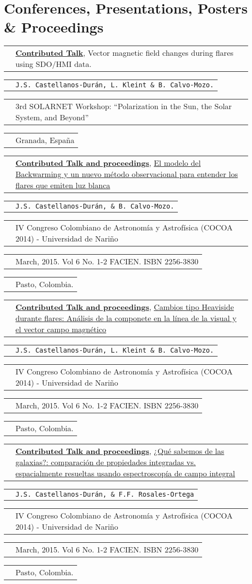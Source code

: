 \documentclass[11pt,letterpaper,sans]{moderncv}        %
\makeatletter
\renewcommand*{\cvitem}[3][.25em]{%
  \begin{tabular}{@{}p{\hintscolumnwidth}@{\hspace{\separatorcolumnwidth}}p{\maincolumnwidth}@{}}%
      \raggedleft\hintstyle{#2} &{#3}%
  \end{tabular}%
  \par\addvspace{#1}}
\makeatother
\begin{document}
\section{Conferences, Presentations, Posters \& Proceedings}
\cvitem{May 25-28}{\href{http://spg.iaa.es/Workshop}{\textbf{Contributed Talk}}, Vector magnetic field changes during flares using SDO/HMI data.}
\cvitem{2015}{\texttt{J.S. Castellanos-Dur\'an, L. Kleint \& B. Calvo-Mozo.}}
\cvitem{}{3rd SOLARNET Workshop: ``Polarization in the Sun, the Solar System, and Beyond''}
\cvitem{}{Granada, España}
\cvitem{Dec 1 - 5 2014}{\href{http://aulavirtual.udenar.edu.co/cocoa/}{\textbf{Contributed Talk and proceedings}}, \href{http://aulavirtual.udenar.edu.co/cocoa/wp-content/uploads/2014/12/Resumenes-IV-COCOA-2014.pdf}{El modelo del Backwarming y un nuevo método observacional para entender los flares que emiten luz blanca} }
\cvitem{}{\texttt{J.S. Castellanos-Dur\'an,  \& B. Calvo-Mozo.}}
\cvitem{}{IV Congreso Colombiano de Astronom\'{i}a y Astrof\'{i}sica (COCOA 2014) - Universidad de Nariño}
\cvitem{}{March, 2015. Vol 6 No. 1-2 FACIEN.  ISBN 2256-3830}
\cvitem{}{Pasto, Colombia.}
\cvitem{Dec 1 - 5 2014}{\href{http://aulavirtual.udenar.edu.co/cocoa/}{\textbf{Contributed Talk and proceedings}}, \href{http://aulavirtual.udenar.edu.co/cocoa/wp-content/uploads/2014/12/Resumenes-IV-COCOA-2014.pdf}{Cambios tipo Heaviside durante flares: Análisis de la componete en la línea de la visual y el vector
campo magnético} }
\cvitem{}{\texttt{J.S. Castellanos-Dur\'an, L. Kleint \& B. Calvo-Mozo.}}
\cvitem{}{IV Congreso Colombiano de Astronom\'{i}a y Astrof\'{i}sica (COCOA 2014) - Universidad de Nariño}
\cvitem{}{March, 2015. Vol 6 No. 1-2 FACIEN. ISBN 2256-3830}
\cvitem{}{Pasto, Colombia.}
\cvitem{Dec 1 - 5 2014}{\href{http://aulavirtual.udenar.edu.co/cocoa/}{\textbf{Contributed Talk and proceedings}}, \href{http://aulavirtual.udenar.edu.co/cocoa/wp-content/uploads/2014/12/Resumenes-IV-COCOA-2014.pdf}{¿Qu\'e sabemos de las galaxias?: comparaci\'on de propiedades integradas vs. espacialmente
resueltas usando espectroscop\'{i}a de campo integral} }
\cvitem{}{\texttt{J.S. Castellanos-Dur\'an,  \& F.F. Rosales-Ortega}}
\cvitem{}{IV Congreso Colombiano de Astronom\'{i}a y Astrof\'{i}sica (COCOA 2014) - Universidad de Nariño}
\cvitem{}{March, 2015. Vol 6 No. 1-2 FACIEN.  ISBN 2256-3830}
\cvitem{}{Pasto, Colombia.}
\end{document}
